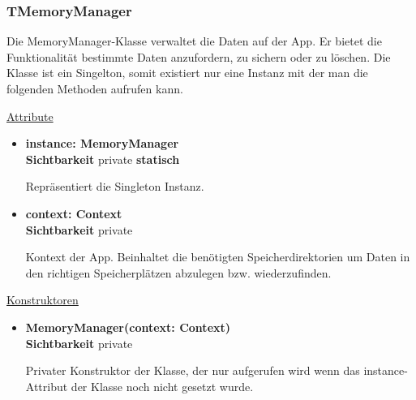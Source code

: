 \subsubsection{TMemoryManager} \label{app:klasse:MemoryManager}
Die MemoryManager-Klasse verwaltet die Daten auf der App. Er bietet die Funktionalität bestimmte Daten anzufordern, zu sichern oder zu löschen. Die Klasse ist ein Singelton, somit existiert nur eine Instanz mit der man die folgenden Methoden aufrufen kann.\newline

\underline{Attribute}
\begin{itemize}
\itemsep0pt
\item \textbf{instance: MemoryManager} \hfill\\ 
\textbf{Sichtbarkeit} private \newline
\textbf{statisch} 

Repräsentiert die Singleton Instanz.

\item \textbf{context: Context} \hfill\\ 
\textbf{Sichtbarkeit} private

Kontext der App. Beinhaltet die benötigten Speicherdirektorien um Daten in den richtigen Speicherplätzen abzulegen bzw. wiederzufinden.
\end{itemize}

\underline{Konstruktoren}
\begin{itemize}
\itemsep0pt
\item \textbf{MemoryManager(context: Context)} \hfill\\
\textbf{Sichtbarkeit} private

Privater Konstruktor der Klasse, der nur aufgerufen wird wenn das instance-Attribut der Klasse noch nicht gesetzt wurde.
\end{itemize}

